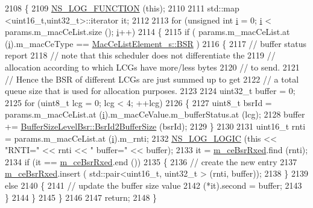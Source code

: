 \begin{DoxyCode}
2108 \{
2109   \hyperlink{log-macros-disabled_8h_a90b90d5bad1f39cb1b64923ea94c0761}{NS\_LOG\_FUNCTION} (\textcolor{keyword}{this});
2110 
2111   std::map <uint16\_t,uint32\_t>::iterator it;
2112 
2113   \textcolor{keywordflow}{for} (\textcolor{keywordtype}{unsigned} \textcolor{keywordtype}{int} \hyperlink{bernuolliDistribution_8m_a6f6ccfcf58b31cb6412107d9d5281426}{i} = 0; \hyperlink{bernuolliDistribution_8m_a6f6ccfcf58b31cb6412107d9d5281426}{i} < params.m\_macCeList.size (); \hyperlink{bernuolliDistribution_8m_a6f6ccfcf58b31cb6412107d9d5281426}{i}++)
2114     \{
2115       \textcolor{keywordflow}{if} ( params.m\_macCeList.at (\hyperlink{bernuolliDistribution_8m_a6f6ccfcf58b31cb6412107d9d5281426}{i}).m\_macCeType == \hyperlink{structns3_1_1MacCeListElement__s_a270a6526dfc7da02e9dc91823c290f6bac50796b01160b1825ec34efa1ad9f051}{MacCeListElement\_s::BSR} )
2116         \{
2117           \textcolor{comment}{// buffer status report}
2118           \textcolor{comment}{// note that this scheduler does not differentiate the}
2119           \textcolor{comment}{// allocation according to which LCGs have more/less bytes}
2120           \textcolor{comment}{// to send.}
2121           \textcolor{comment}{// Hence the BSR of different LCGs are just summed up to get}
2122           \textcolor{comment}{// a total queue size that is used for allocation purposes.}
2123 
2124           uint32\_t buffer = 0;
2125           \textcolor{keywordflow}{for} (uint8\_t lcg = 0; lcg < 4; ++lcg)
2126             \{
2127               uint8\_t bsrId = params.m\_macCeList.at (\hyperlink{bernuolliDistribution_8m_a6f6ccfcf58b31cb6412107d9d5281426}{i}).m\_macCeValue.m\_bufferStatus.at (lcg);
2128               buffer += \hyperlink{classns3_1_1BufferSizeLevelBsr_a67fc905f267ed8ac5a617fe229699122}{BufferSizeLevelBsr::BsrId2BufferSize} (bsrId);
2129             \}
2130           
2131           uint16\_t rnti = params.m\_macCeList.at (\hyperlink{bernuolliDistribution_8m_a6f6ccfcf58b31cb6412107d9d5281426}{i}).m\_rnti;
2132           \hyperlink{group__logging_ga88acd260151caf2db9c0fc84997f45ce}{NS\_LOG\_LOGIC} (\textcolor{keyword}{this} << \textcolor{stringliteral}{"RNTI="} << rnti << \textcolor{stringliteral}{" buffer="} << buffer);
2133           it = \hyperlink{classns3_1_1FdTbfqFfMacScheduler_a4affe9fe434a4cb87f5875ddf1766d61}{m\_ceBsrRxed}.find (rnti);
2134           \textcolor{keywordflow}{if} (it == \hyperlink{classns3_1_1FdTbfqFfMacScheduler_a4affe9fe434a4cb87f5875ddf1766d61}{m\_ceBsrRxed}.end ())
2135             \{
2136               \textcolor{comment}{// create the new entry}
2137               \hyperlink{classns3_1_1FdTbfqFfMacScheduler_a4affe9fe434a4cb87f5875ddf1766d61}{m\_ceBsrRxed}.insert ( std::pair<uint16\_t, uint32\_t > (rnti, buffer));
2138             \}
2139           \textcolor{keywordflow}{else}
2140             \{
2141               \textcolor{comment}{// update the buffer size value}
2142               (*it).second = buffer;
2143             \}
2144         \}
2145     \}
2146 
2147   \textcolor{keywordflow}{return};
2148 \}
\end{DoxyCode}


